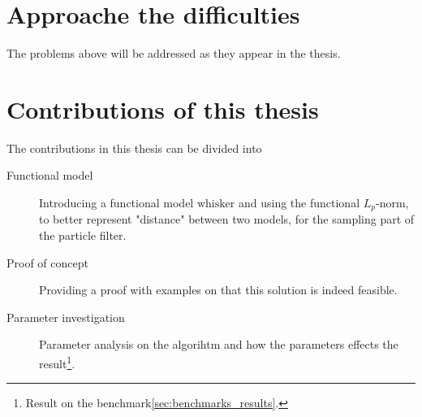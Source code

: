 \section{Approache the difficulties}
The problems above will be addressed as they appear in the thesis.

\section{Contributions of this thesis}
The contributions in this thesis can be divided into
\begin{description}
    \item[Functional model] 
        Introducing a functional model $\text{whisker}$ and using the functional $L_p$-norm, 
        to better represent "distance" between two models, 
        for the sampling part of the particle filter.
    \item[Proof of concept]
        Providing a proof with examples on that this solution is indeed feasible.
    \item[Parameter investigation]
        Parameter analysis on the algorihtm and how the parameters effects the result\footnote{Result on the benchmark\ref{sec:benchmarks_results}.}.

\end{description}




